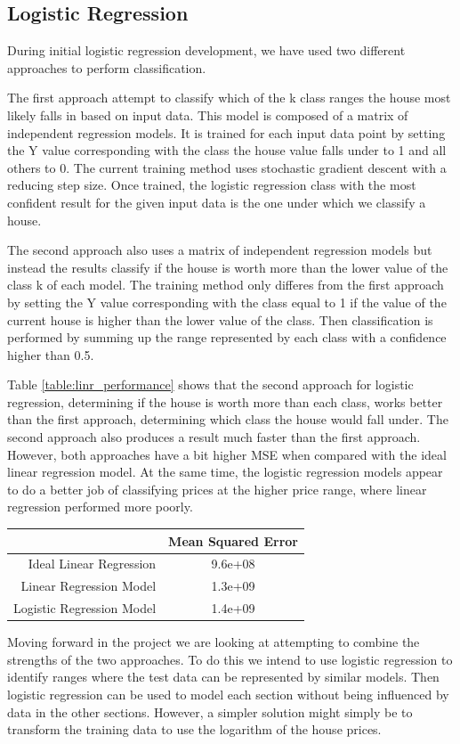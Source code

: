 \documentclass[letter,10pt]{article}
\begin{document}
\begin{multicols}{2}
		\subsection{Logistic Regression}
			During initial logistic regression development, we have used two different approaches to perform classification.
		\par
			The first approach attempt to classify which of the k class ranges the house most likely falls in based on input data. This model is composed of a matrix of independent regression models. It is trained for each input data point by setting the Y value corresponding with the class the house value falls under to 1 and all others to 0. The current training method uses stochastic gradient descent with a reducing step size. Once trained, the logistic regression class with the most confident result for the given input data is the one under which we classify a house.
		\par
	 		The second approach also uses a matrix of independent regression models but instead the results classify if the house is worth more than the lower value of the class k of each model. The training method only differes from the first approach by setting the Y value corresponding with the class equal to 1 if the value of the current house is higher than the lower value of the class. Then classification is performed by summing up the range represented by each class with a confidence higher than 0.5.
		\par
 			Table \ref{table:linr_performance} shows that the second approach for logistic regression, determining if the house is worth more than each class, works better than the first approach, determining which class the house would fall under. The second approach also produces a result much faster than the first approach. However, both approaches have a bit higher MSE when compared with the ideal linear regression model. At the same time, the logistic regression models appear to do a better job of classifying prices at the higher price range, where linear regression performed more poorly.
		\par
			\begin{tabular}{r|c}
				& \small{Mean Squared Error} \\
				\hline
				\small{Ideal Linear Regression} & \small{9.6e+08} \\
				\hline
				\small{Linear Regression Model} & \small{1.3e+09} \\
				\hline
				\small{Logistic Regression Model} & \small{1.4e+09} \\
				\hline
			\end{tabular}
			\label{table:logr_performance}
		\par
 			Moving forward in the project we are looking at attempting to combine the strengths of the two approaches. To do this we intend to use logistic regression to identify ranges where the test data can be represented by similar models. Then logistic regression can be used to model each section without being influenced by data in the other sections. However, a simpler solution might simply be to transform the training data to use the logarithm of the house prices.

\end{multicols}
\end{document}
